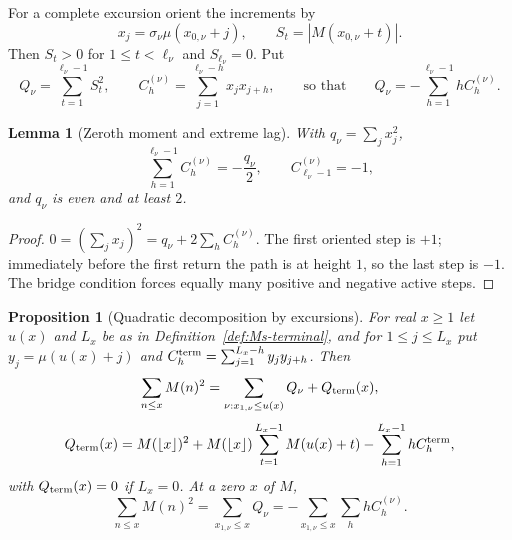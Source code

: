 \documentclass[11pt]{amsart}
\numberwithin{equation}{section}
\theoremstyle{plain}
\newtheorem{proposition}[theorem]{Proposition}
\newtheorem{lemma}[theorem]{Lemma}
\theoremstyle{definition}
\theoremstyle{remark}
\begin{document}
For a complete excursion orient the increments by
\begin{equation}
\label{eq:orientation}
x_j=\sigma_\nu\mu(x_{0,\nu}+j),\qquad
S_t=|M(x_{0,\nu}+t)|.
\end{equation}
Then $S_t>0$ for $1\le t<\ell_\nu$ and $S_{\ell_\nu}=0$. Put
\begin{equation}
\label{eq:Q_def}
Q_\nu=\sum_{t=1}^{\ell_\nu-1}S_t^2,\qquad
C_h^{(\nu)}=\sum_{j=1}^{\ell_\nu-h}x_jx_{j+h},
\qquad\text{so that}\qquad
Q_\nu=-\sum_{h=1}^{\ell_\nu-1}hC_h^{(\nu)}.
\end{equation}

\begin{lemma}[Zeroth moment and extreme lag]
\label{lem:zeroth-corr}
\label{lem:extreme-lag}
With $q_\nu=\sum_jx_j^2$,
\begin{equation}
\label{eq:zeroth-corr}
\sum_{h=1}^{\ell_\nu-1}C_h^{(\nu)}=-\frac{q_\nu}{2},\qquad
C_{\ell_\nu-1}^{(\nu)}=-1,
\end{equation}
and $q_\nu$ is even and at least $2$.
\end{lemma}

\begin{proof}
$0=(\sum_jx_j)^2=q_\nu+2\sum_hC_h^{(\nu)}$. The first oriented step is $+1$;
immediately before the first return the path is at height $1$, so the last
step is $-1$. The bridge condition forces equally many positive and negative
active steps.
\end{proof}

\begin{proposition}[Quadratic decomposition by excursions]
\label{prop:quadratic-decomp}
For real $x\ge1$ let $u(x)$ and $L_x$ be as in
Definition~\ref{def:Ms-terminal}, and for $1\le j\le L_x$ put
$y_j=\mu(u(x)+j)$ and $C_h^{\rm term}=\sum_{j=1}^{L_x-h}y_jy_{j+h}$. Then
\begin{equation}
\label{eq:quadratic-decomp-general}
\sum_{n\le x}M(n)^2
=\sum_{\nu:x_{1,\nu}\le u(x)}Q_\nu+Q_{\rm term}(x),
\end{equation}
\begin{equation}
\label{eq:terminal-Q-exact}
Q_{\rm term}(x)=M(\lfloor x\rfloor)^2
+M(\lfloor x\rfloor)\sum_{t=1}^{L_x-1}M(u(x)+t)
-\sum_{h=1}^{L_x-1}hC_h^{\rm term},
\end{equation}
with $Q_{\rm term}(x)=0$ if $L_x=0$. At a zero $x$ of $M$,
\begin{equation}
\label{eq:quadratic-decomp-zero}
\sum_{n\le x}M(n)^2
=\sum_{x_{1,\nu}\le x}Q_\nu
=-\sum_{x_{1,\nu}\le x}\sum_hhC_h^{(\nu)}.
\end{equation}
\end{proposition}
\end{document}
